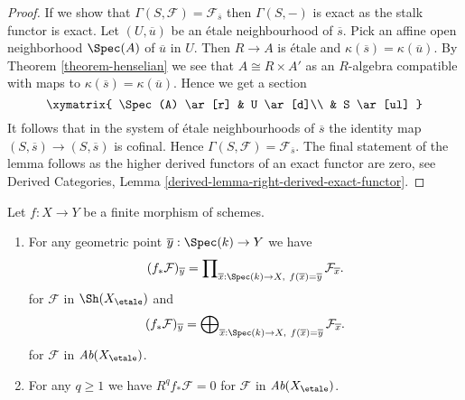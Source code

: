 \begin{proof}
If we show that $\Gamma(S, \mathcal{F}) = \mathcal{F}_{\overline{s}}$
then $\Gamma(S, -)$ is exact as the stalk functor is exact.
Let $(U, \overline{u})$ be an \'etale neighbourhood of $\overline{s}$.
Pick an affine open neighborhood $\Spec(A)$ of $\overline{u}$ in $U$.
Then $R \to A$ is \'etale and $\kappa(\overline{s}) = \kappa(\overline{u})$.
By Theorem \ref{theorem-henselian} we see that $A \cong R \times A'$
as an $R$-algebra compatible with maps to
$\kappa(\overline{s}) = \kappa(\overline{u})$.
Hence we get a section
$$
\xymatrix{
\Spec(A) \ar[r] & U \ar[d]\\
& S \ar[ul]
}
$$
It follows that in the system of \'etale neighbourhoods of $\overline{s}$
the identity map $(S, \overline{s}) \to (S, \overline{s})$ is cofinal.
Hence $\Gamma(S, \mathcal{F}) = \mathcal{F}_{\overline{s}}$.
The final statement of the lemma follows as the higher derived
functors of an exact functor are zero, see
Derived Categories, Lemma \ref{derived-lemma-right-derived-exact-functor}.
\end{proof}

\begin{proposition}
\label{proposition-finite-higher-direct-image-zero}
Let $f : X \to Y$ be a finite morphism of schemes.
\begin{enumerate}
\item For any geometric point $\overline{y} : \Spec(k) \to Y$ we have
$$
(f_*\mathcal{F})_{\overline{y}} =
\prod\nolimits_{\overline{x} : \Spec(k) \to X,\ f(\overline{x}) =
\overline{y}} \mathcal{F}_{\overline{x}}.
$$
for $\mathcal{F}$ in $\Sh(X_\etale)$ and
$$
(f_*\mathcal{F})_{\overline{y}} =
\bigoplus\nolimits_{\overline{x} : \Spec(k) \to X,\ f(\overline{x}) =
\overline{y}} \mathcal{F}_{\overline{x}}.
$$
for $\mathcal{F}$ in $\textit{Ab}(X_\etale)$.
\item For any $q \geq 1$ we have $R^q f_*\mathcal{F} = 0$
for $\mathcal{F}$ in $\textit{Ab}(X_\etale)$.
\end{enumerate}
\end{proposition}


